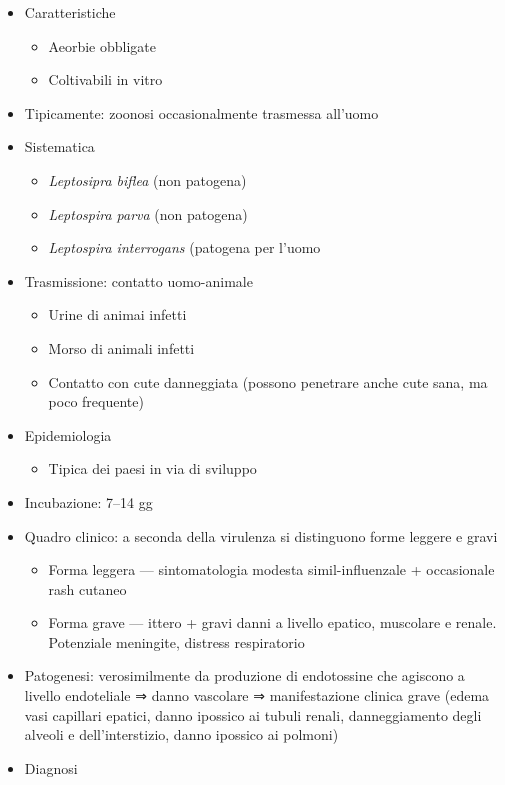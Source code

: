 \documentclass[italian,]{article}
\providecommand{\tightlist}{%
  \setlength{\itemsep}{0pt}\setlength{\parskip}{0pt}}
\begin{document}
\begin{itemize}
\tightlist
\item
  Caratteristiche

  \begin{itemize}
  \tightlist
  \item
    Aeorbie obbligate
  \item
    Coltivabili in vitro
  \end{itemize}
\item
  Tipicamente: zoonosi occasionalmente trasmessa all'uomo
\item
  Sistematica

  \begin{itemize}
  \tightlist
  \item
    \emph{Leptosipra biflea} (non patogena)
  \item
    \emph{Leptospira parva} (non patogena)
  \item
    \emph{Leptospira interrogans} (patogena per l'uomo
  \end{itemize}
\item
  Trasmissione: contatto uomo-animale

  \begin{itemize}
  \tightlist
  \item
    Urine di animai infetti
  \item
    Morso di animali infetti
  \item
    Contatto con cute danneggiata (possono penetrare anche cute sana, ma
    poco frequente)
  \end{itemize}
\item
  Epidemiologia

  \begin{itemize}
  \tightlist
  \item
    Tipica dei paesi in via di sviluppo
  \end{itemize}
\item
  Incubazione: 7--14 gg
\item
  Quadro clinico: a seconda della virulenza si distinguono forme leggere
  e gravi

  \begin{itemize}
  \tightlist
  \item
    Forma leggera --- sintomatologia modesta simil-influenzale +
    occasionale rash cutaneo
  \item
    Forma grave --- ittero + gravi danni a livello epatico, muscolare e
    renale. Potenziale meningite, distress respiratorio
  \end{itemize}
\item
  Patogenesi: verosimilmente da produzione di endotossine che agiscono a
  livello endoteliale ⇒ danno vascolare ⇒ manifestazione clinica grave
  (edema vasi capillari epatici, danno ipossico ai tubuli renali,
  danneggiamento degli alveoli e dell'interstizio, danno ipossico ai
  polmoni)
\item
  Diagnosi


\end{itemize}
\end{document}

